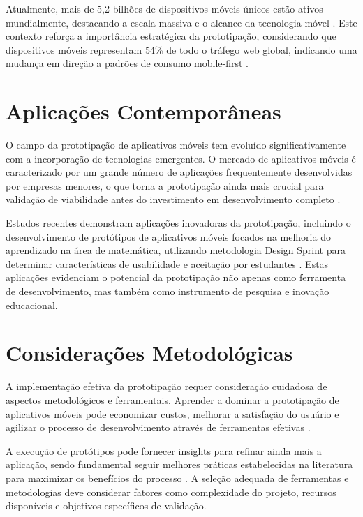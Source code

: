 Atualmente, mais de 5,2 bilhões de dispositivos móveis únicos estão ativos mundialmente, destacando a escala massiva e o alcance da tecnologia móvel \cite{netguru_prototyping}. Este contexto reforça a importância estratégica da prototipação, considerando que dispositivos móveis representam 54\% de todo o tráfego web global, indicando uma mudança em direção a padrões de consumo mobile-first \cite{netguru_prototyping}.


\section{Aplicações Contemporâneas}

O campo da prototipação de aplicativos móveis tem evoluído significativamente com a incorporação de tecnologias emergentes. O mercado de aplicativos móveis é caracterizado por um grande número de aplicações frequentemente desenvolvidas por empresas menores, o que torna a prototipação ainda mais crucial para validação de viabilidade antes do investimento em desenvolvimento completo \cite{researchgate_ai_prototyping}.

Estudos recentes demonstram aplicações inovadoras da prototipação, incluindo o desenvolvimento de protótipos de aplicativos móveis focados na melhoria do aprendizado na área de matemática, utilizando metodologia Design Sprint para determinar características de usabilidade e aceitação por estudantes \cite{salud_ciencia_prototyping}. Estas aplicações evidenciam o potencial da prototipação não apenas como ferramenta de desenvolvimento, mas também como instrumento de pesquisa e inovação educacional.

\section{Considerações Metodológicas}

A implementação efetiva da prototipação requer consideração cuidadosa de aspectos metodológicos e ferramentais. Aprender a dominar a prototipação de aplicativos móveis pode economizar custos, melhorar a satisfação do usuário e agilizar o processo de desenvolvimento através de ferramentas efetivas \cite{decode_best_practices}.

A execução de protótipos pode fornecer insights para refinar ainda mais a aplicação, sendo fundamental seguir melhores práticas estabelecidas na literatura para maximizar os benefícios do processo \cite{ossisto_guide}. A seleção adequada de ferramentas e metodologias deve considerar fatores como complexidade do projeto, recursos disponíveis e objetivos específicos de validação.


